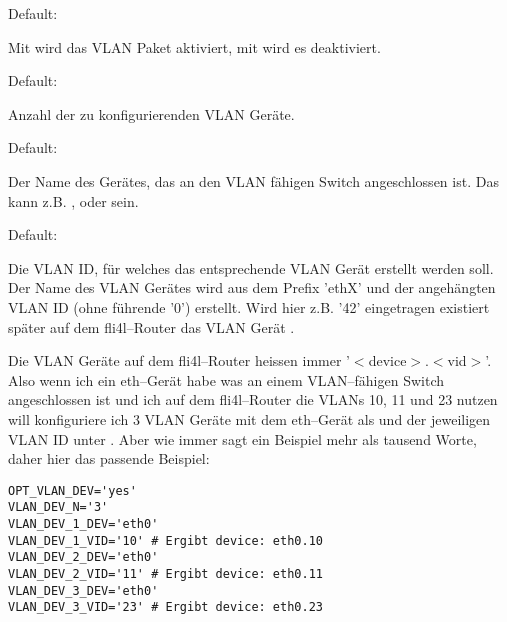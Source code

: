 \begin{description}


  Default: 

  Mit  wird das VLAN Paket aktiviert, mit  wird
  es deaktiviert.


  Default: 

  Anzahl der zu konfigurierenden VLAN Geräte.


  Default: 

  Der Name des Gerätes, das an den VLAN fähigen Switch angeschlossen
  ist. Das kann z.B. ,  oder  sein.


  Default: 

  Die VLAN ID, für welches das entsprechende VLAN Gerät erstellt
  werden soll. Der Name des VLAN Gerätes wird aus dem Prefix 'ethX'
  und der angehängten VLAN ID (ohne führende '0') erstellt. Wird hier
  z.B. '42' eingetragen existiert später auf dem fli4l--Router das
  VLAN Gerät .

\end{description}

Die VLAN Geräte auf dem fli4l--Router heissen immer '$<$device$>$.$<$vid$>$'. Also
wenn ich ein eth--Gerät habe was an einem VLAN--fähigen Switch
angeschlossen ist und ich auf dem fli4l--Router die VLANs 10, 11 und
23 nutzen will konfiguriere ich 3 VLAN Geräte mit dem eth--Gerät als
 und der jeweiligen VLAN ID unter
. Aber wie immer sagt ein Beispiel mehr
als tausend Worte, daher hier das passende Beispiel:

\begin{example}
\begin{verbatim}
OPT_VLAN_DEV='yes'
VLAN_DEV_N='3'
VLAN_DEV_1_DEV='eth0'
VLAN_DEV_1_VID='10'	# Ergibt device: eth0.10
VLAN_DEV_2_DEV='eth0'
VLAN_DEV_2_VID='11'	# Ergibt device: eth0.11
VLAN_DEV_3_DEV='eth0'
VLAN_DEV_3_VID='23'	# Ergibt device: eth0.23
\end{verbatim}
\end{example}

